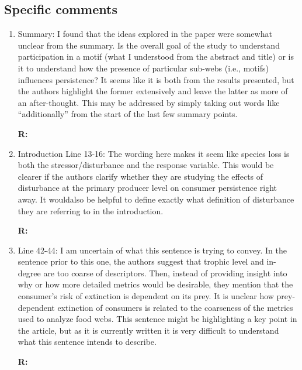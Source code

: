 \documentclass[12pt]{article}
\begin{document}
    \subsection*{Specific comments}

        \begin{enumerate}

            \item Summary: I found that the ideas explored in the paper were somewhat unclear from the summary. Is the overall goal of the study to understand participation in a motif (what I understood from the abstract and title) or is it to understand how the presence of particular sub-webs (i.e., motifs) influences persistence? It seems like it is both from the results presented, but the authors highlight the former extensively and leave the latter as more of an after-thought. This may be addressed by simply taking out words like “additionally” from the start of the last few summary points.

                \textbf{R:}

    
            \item Introduction Line 13-16: The wording here makes it seem like species loss is both the stressor/disturbance and the response variable. This would be clearer if the authors clarify whether they are studying the effects of disturbance at the primary producer level on consumer persistence right away. It wouldalso be helpful to define exactly what definition of disturbance they are referring to in the introduction.

                \textbf{R:}


            \item Line 42-44: I am uncertain of what this sentence is trying to convey. In the sentence prior to this one, the authors suggest that trophic level and in-degree are too coarse of descriptors. Then, instead of providing insight into why or how more detailed metrics would be desirable, they mention that the consumer's risk of extinction is dependent on its prey. It is unclear how prey-dependent extinction of consumers is related to the coarseness of the metrics used to analyze food webs. This sentence might be highlighting a key point in the article, but as it is currently written it is very difficult to understand what this sentence intends to describe.

                \textbf{R:}



\end{enumerate}
\end{document}
